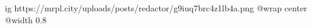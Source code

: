  
 
 
 
 

\ifcmt
  ig https://mrpl.city/uploads/posts/redactor/g9iuq7brc4z1lb4a.png
  @wrap center
  @width 0.8
\fi
